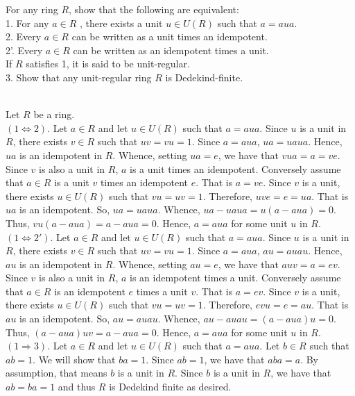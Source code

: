 For any ring $R$, show that the following are equivalent:\\
1. For any $a\in R$ , there exists a unit $u\in U(R)$ such that $a=aua$.\\
2. Every $a\in R$ can be written as a unit times an idempotent.\\
2'. Every $a\in R$ can be written as an idempotent times a unit.\\
If $R$ satisfies 1, it is said to be unit-regular.\\
3. Show that any unit-regular ring $R$ is Dedekind-finite.\\

\begin{solution}\renewcommand{\qedsymbol}{}\ \\
    Let $R$ be a ring.\\
    $(1\Leftrightarrow2)$. Let $a\in R$ and let $u\in U(R)$ such that $a=aua$. Since $u$ is a unit in
    $R$, there exists $v\in R$ such that $uv=vu=1$. Since $a=aua$, $ua=uaua$. Hence, $ua$ is an
    idempotent in $R$. Whence, setting $ua=e$, we have that $vua=a=ve$. Since $v$ is also a unit in $R$,
    $a$ is a unit times an idempotent. Conversely assume that $a\in R$ is a unit $v$ times an idempotent
    $e$. That is $a=ve$. Since $v$ is a unit, there exists $u\in U(R)$ such that $vu=uv=1$. Therefore,
    $uve=e=ua$. That is $ua$ is an idempotent. So, $ua=uaua$. Whence, $ua-uaua=u(a-aua)=0$. Thus,
    $vu(a-aua)=a-aua=0$. Hence, $a=aua$ for some unit $u$ in $R$.\\

    $(1\Leftrightarrow2')$. Let $a\in R$ and let $u\in U(R)$ such that $a=aua$. Since $u$ is a unit in
    $R$, there exists $v\in R$ such that $uv=vu=1$. Since $a=aua$, $au=auau$. Hence, $au$ is an
    idempotent in $R$. Whence, setting $au=e$, we have that $auv=a=ev$. Since $v$ is also a unit in $R$,
    $a$ is an idempotent times a unit. Conversely assume that $a\in R$ is an idempotent $e$ times a unit
    $v$. That is $a=ev$. Since $v$ is a unit, there exists $u\in U(R)$ such that $vu=uv=1$. Therefore,
    $evu=e=au$. That is $au$ is an idempotent. So, $au=auau$. Whence, $au-auau=(a-aua)u=0$. Thus,
    $(a-aua)uv=a-aua=0$. Hence, $a=aua$ for some unit $u$ in $R$.\\

    $(1\Rightarrow3)$. Let $a\in R$ and let $u\in U(R)$ such that $a=aua$. Let $b\in R$ such that
    $ab=1$. We will show that $ba=1$. Since $ab=1$, we have that $aba=a$. By assumption, that means $b$
    is a unit in $R$. Since $b$ is a unit in $R$, we have that $ab=ba=1$ and thus $R$ is Dedekind finite
    as desired.

\end{solution}
